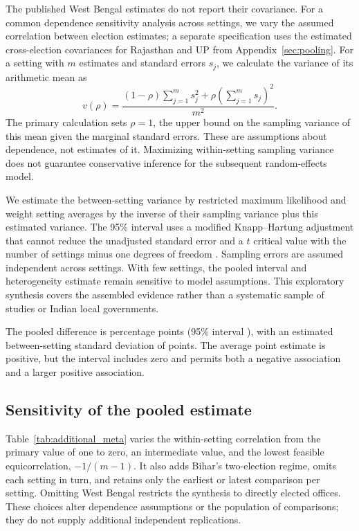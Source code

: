 The published West Bengal estimates do not report their covariance. For a common dependence sensitivity analysis across settings, we vary the assumed correlation between election estimates; a separate specification uses the estimated cross-election covariances for Rajasthan and UP from Appendix~\ref{sec:pooling}. For a setting with $m$ estimates and standard errors $s_j$, we calculate the variance of its arithmetic mean as
\[
 v(\rho)=\frac{(1-\rho)\sum_{j=1}^{m}s_j^2+\rho\left(\sum_{j=1}^{m}s_j\right)^2}{m^2}.
\]
The primary calculation sets $\rho=1$, the upper bound on the sampling variance of this mean given the marginal standard errors. These are assumptions about dependence, not estimates of it. Maximizing within-setting sampling variance does not guarantee conservative inference for the subsequent random-effects model.

We estimate the between-setting variance by restricted maximum likelihood and weight setting averages by the inverse of their sampling variance plus this estimated variance. The 95\% interval uses a modified Knapp--Hartung adjustment that cannot reduce the unadjusted standard error and a $t$ critical value with the number of settings minus one degrees of freedom \citep{viechtbauer2010metafor}. Sampling errors are assumed independent across settings. With few settings, the pooled interval and heterogeneity estimate remain sensitive to model assumptions. This exploratory synthesis covers the assembled evidence rather than a systematic sample of studies or Indian local governments.

The pooled difference is \appMetaEstimate{} percentage points (95\% interval \appMetaInterval{}), with an estimated between-setting standard deviation of \appMetaTau{} points. The average point estimate is positive, but the interval includes zero and permits both a negative association and a larger positive association.


\subsection{Sensitivity of the pooled estimate}\label{sec:additional_pool_sensitivity} Table~\ref{tab:additional_meta} varies the within-setting correlation from the primary value of one to zero, an intermediate value, and the lowest feasible equicorrelation, $-1/(m-1)$. It also adds Bihar's two-election regime, omits each setting in turn, and retains only the earliest or latest comparison per setting. Omitting West Bengal restricts the synthesis to directly elected offices. These choices alter dependence assumptions or the population of comparisons; they do not supply additional independent replications.

